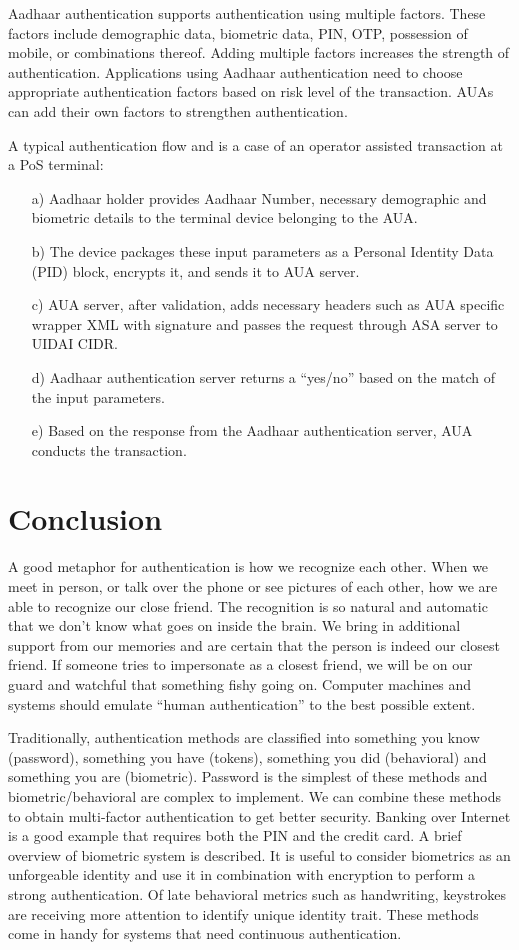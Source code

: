 \begin{multicols}{2}
Aadhaar authentication supports authentication using multiple factors. These factors include demographic data, biometric data, PIN, OTP, possession of mobile, or combinations thereof. Adding multiple factors increases the strength of authentication. Applications using Aadhaar authentication need to choose appropriate authentication factors based on risk level of the transaction. AUAs can add their own factors to strengthen authentication.
 
A typical authentication flow and is a case of an operator assisted transaction at a PoS terminal:
\begin{itemize}
\item[a)] Aadhaar holder provides Aadhaar Number, necessary demographic and biometric details to the terminal device belonging to the AUA.
\item[b)] The device packages these input parameters as a Personal Identity Data (PID) block, encrypts it, and sends it to AUA server.	
\item[c)] AUA server, after validation, adds necessary headers such as AUA specific wrapper XML with signature and passes the request through ASA server to UIDAI CIDR.	
\item[d)] Aadhaar authentication server returns a ``yes/no'' based on the match of the input parameters.
\item[e)] Based on the response from the Aadhaar authentication server, AUA conducts the transaction.
\end{itemize}

\section*{Conclusion}

A good metaphor for authentication is how we recognize each other. When we meet in person, or talk over the phone or see pictures of each other, how we are able to recognize our close friend. The recognition is so natural and automatic that we don't know what goes on inside the brain. We bring in additional support from our memories and are certain that the person is indeed our closest friend. If someone tries to impersonate as a closest friend, we will be on our guard and watchful that something fishy going on. Computer machines and systems should emulate ``human authentication'' to the best possible extent.

Traditionally, authentication methods are classified into something you know (password), something you have (tokens), something you did (behavioral) and something you are (biometric). Password is the simplest of these methods and biometric/behavioral are complex to implement. We can combine these methods to obtain multi-factor authentication to get better security. Banking over Internet is a good example that requires both the PIN and the credit card. A brief overview of biometric system is described. It is useful to consider biometrics as an unforgeable identity and use it in combination with encryption to perform a strong authentication. Of late behavioral metrics such as handwriting, keystrokes are receiving more attention to identify unique identity trait. These methods come in handy for systems that need continuous authentication.


\end{multicols}
